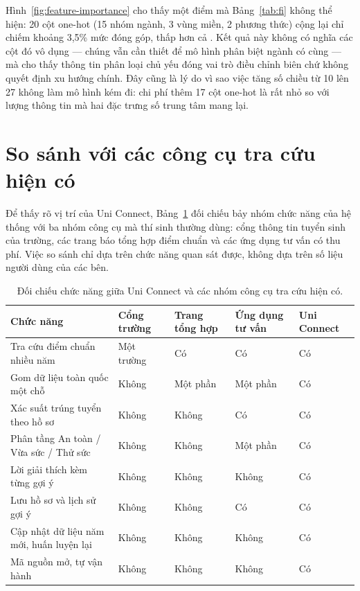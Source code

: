 Hình~\ref{fig:feature-importance} cho thấy một điểm mà Bảng~\ref{tab:fi} không thể
hiện: 20 cột one-hot (15 nhóm ngành, 3 vùng miền, 2 phương thức) cộng lại chỉ chiếm
khoảng 3,5\% mức đóng góp, thấp hơn cả . Kết quả này không có nghĩa
các cột đó vô dụng --- chúng vẫn cần thiết để mô hình phân biệt ngành có cùng
 --- mà cho thấy thông tin phân loại chủ yếu đóng vai trò điều chỉnh biên
chứ không quyết định xu hướng chính. Đây cũng là lý do vì sao việc tăng số chiều từ 10
lên 27 không làm mô hình kém đi: chi phí thêm 17 cột one-hot là rất nhỏ so với lượng
thông tin mà hai đặc trưng số trung tâm mang lại.

\section{So sánh với các công cụ tra cứu hiện có}

Để thấy rõ vị trí của Uni Connect, Bảng~\ref{tab:so-sanh-congcu} đối chiếu bảy nhóm
chức năng của hệ thống với ba nhóm công cụ mà thí sinh thường dùng: cổng thông tin
tuyển sinh của trường, các trang báo tổng hợp điểm chuẩn và các ứng dụng tư vấn có
thu phí. Việc so sánh chỉ dựa trên chức năng quan sát được, không dựa trên số liệu
người dùng của các bên.

\begin{table}[H]
\centering
\caption{Đối chiếu chức năng giữa Uni Connect và các nhóm công cụ tra cứu hiện có.}
\label{tab:so-sanh-congcu}
\small
\begin{tabularx}{\textwidth}{@{}>{\raggedright\arraybackslash}p{4.1cm}
  >{\centering\arraybackslash}p{1.9cm}
  >{\centering\arraybackslash}p{2.1cm}
  >{\centering\arraybackslash}p{1.9cm}
  >{\centering\arraybackslash}p{1.6cm}@{}}
\toprule
\rowcolor{gray100}\bfseries\color{daunavy}Chức năng &
\bfseries\color{daunavy}Cổng trường &
\bfseries\color{daunavy}Trang tổng hợp &
\bfseries\color{daunavy}Ứng dụng tư vấn &
\bfseries\color{daumaroon}Uni Connect \\
\midrule
Tra cứu điểm chuẩn nhiều năm & Một trường & Có & Có & Có \\
Gom dữ liệu toàn quốc một chỗ & Không & Một phần & Một phần & Có \\
Xác suất trúng tuyển theo hồ sơ & Không & Không & Có & Có \\
Phân tầng An toàn / Vừa sức / Thử sức & Không & Không & Một phần & Có \\
Lời giải thích kèm từng gợi ý & Không & Không & Không & Có \\
Lưu hồ sơ và lịch sử gợi ý & Không & Không & Có & Có \\
Cập nhật dữ liệu năm mới, huấn luyện lại & Không & Không & Không & Có \\
Mã nguồn mở, tự vận hành & Không & Không & Không & Có \\
\bottomrule
\end{tabularx}
\end{table}

